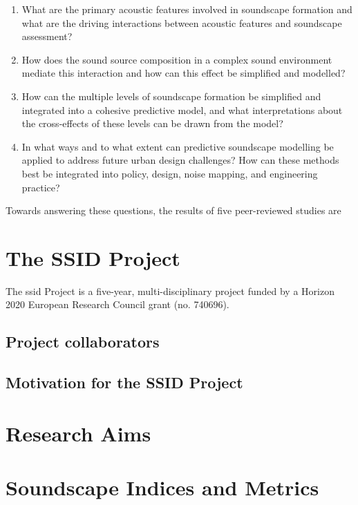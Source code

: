 \begin{enumerate}
  \item What are the primary acoustic features involved in soundscape formation and what are the driving interactions between acoustic features and soundscape assessment?
  \item How does the sound source composition in a complex sound environment mediate this interaction and how can this effect be simplified and modelled?
  \item How can the multiple levels of soundscape formation be simplified and integrated into a cohesive predictive model, and what interpretations about the cross-effects of these levels can be drawn from the model?
  \item In what ways and to what extent can predictive soundscape modelling be applied to address future urban design challenges? How can these methods best be integrated into policy, design, noise mapping, and engineering practice?
\end{enumerate}

Towards answering these questions, the results of five %
peer-reviewed studies are

\section{The SSID Project}
The \gls{ssid} Project is a five-year, multi-disciplinary project funded by a Horizon 2020 European Research Council grant (no. 740696).

\subsection{Project collaborators}

\subsection{Motivation for the SSID Project}

\section{Research Aims}

\section{Soundscape Indices and Metrics}


